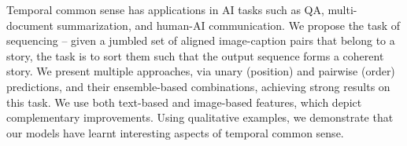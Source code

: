 Temporal common sense has applications in AI tasks such as QA, multi-document summarization, and human-AI communication. We propose the task of sequencing -- given a jumbled set of aligned image-caption pairs that belong to a story, the task is to sort them such that the output sequence forms a coherent story. We present multiple approaches, via unary (position) and pairwise (order) predictions, and their ensemble-based combinations, achieving strong results on this task. We use both text-based and image-based features, which depict complementary improvements. Using qualitative examples, we demonstrate that our models have learnt interesting aspects of temporal common sense.

